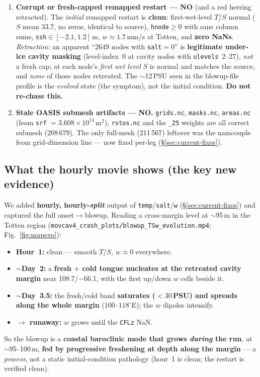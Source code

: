 \documentclass[11pt,a4paper]{article}
\newcommand{\code}[1]{\texttt{\small #1}}
\newcommand{\file}[1]{\texttt{\footnotesize #1}}
\begin{document}
\begin{enumerate}[leftmargin=1.6em,itemsep=3pt]
  \item \textbf{Corrupt or fresh-capped remapped restart --- NO} (and a red herring retracted).
        The \emph{initial} remapped restart is \textbf{clean}: first-wet-level $T$/$S$ normal
        ($S$ mean $33.7$, no zeros, identical to source), \code{hnode}$\ge0$ with sane column
        sums, \code{ssh}$\in[-2.1,1.2]$\,m, $w\approx1.7$\,mm/s at Totten, and \textbf{zero
        NaNs}. \emph{Retraction:} an apparent ``$2649$ nodes with \code{salt}$=0$'' is
        \textbf{legitimate under-ice cavity masking} (level-index~0 at cavity nodes with
        \code{ulevels}~$2$--$27$), \emph{not} a fresh cap; at each node's \emph{first wet
        level} $S$ is normal and matches the source, and \emph{none} of those nodes retreated.
        The $\sim$12\,PSU seen in the blowup-file profile is the \emph{evolved} state (the
        symptom), not the initial condition. \textbf{Do not re-chase this.}
  \item \textbf{Stale OASIS submesh artifacts --- NO.} \file{grids.nc}, \file{masks.nc},
        \file{areas.nc} (feom \code{srf} $=3.608\times10^{14}$\,m$^2$), \file{rstos.nc} and
        the \code{\_25} weights are all correct submesh (208\,679). The only full-mesh
        (211\,567) leftover was the namcouple feom grid-dimension line --- now fixed per-leg
        (\S\ref{sec:current-fixes}).
\end{enumerate}

\subsection{What the hourly movie shows (the key new evidence)}\label{sec:movie}
We added \textbf{hourly, hourly-\emph{split}} output of \code{temp}/\code{salt}/\code{w}
(\S\ref{sec:current-fixes}) and captured the full onset$\to$blowup. Reading a cross-margin
level at $\sim$95\,m in the Totten region (\file{movcav4\_crash\_plots/blowup\_TSw\_evolution.mp4};
Fig.~\ref{fig:mapevo}):
\begin{itemize}[leftmargin=1.4em,itemsep=1pt]
  \item \textbf{Hour~1:} clean --- smooth $T$/$S$, $w\approx0$ everywhere.
  \item \textbf{$\sim$Day~2:} a \textbf{fresh $+$ cold tongue nucleates at the retreated
        cavity margin} near 108.7/$-$66.1, with the first up/down $w$ cells beside it.
  \item \textbf{$\sim$Day~3.5:} the fresh/cold band \textbf{saturates ($<30$\,PSU) and spreads
        along the whole margin} ($100$--$118^\circ$E); the $w$ dipoles intensify.
  \item \textbf{$\to$ runaway:} $w$ grows until the \code{CFLz} NaN.
\end{itemize}
So the blowup is a \textbf{coastal baroclinic mode that grows \emph{during} the run}, at
$\sim$95--100\,m, \textbf{fed by progressive freshening at depth along the margin} --- a
\emph{process}, not a static initial-condition pathology (hour~1 is clean; the restart is
verified clean).
\end{document}
